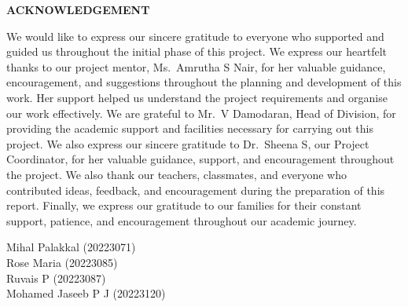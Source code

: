 \clearpage
{}
{}
\thispagestyle{footeronly}
\begin{center}
{\fontsize{16}{20}\selectfont \textbf{ACKNOWLEDGEMENT}}
\end{center}

\vspace{0.8cm}
\justifying
\noindent
We would like to express our sincere gratitude to everyone who supported and guided us throughout the initial phase of this project. We express our heartfelt thanks to our project mentor, Ms.~Amrutha S Nair, for her valuable guidance, encouragement, and suggestions throughout the planning and development of this work. Her support helped us understand the project requirements and organise our work effectively. We are grateful to Mr.~V Damodaran, Head of Division, for providing the academic support and facilities necessary for carrying out this project. We also express our sincere gratitude to Dr.~Sheena S, our Project Coordinator, for her valuable guidance, support, and encouragement throughout the project. We also thank our teachers, classmates, and everyone who contributed ideas, feedback, and encouragement during the preparation of this report. Finally, we express our gratitude to our families for their constant support, patience, and encouragement throughout our academic journey.

\vspace{2cm}

\begin{flushleft}
Mihal Palakkal (20223071)\\[0.2cm]
Rose Maria (20223085)\\[0.2cm]
Ruvais P (20223087)\\[0.2cm]
Mohamed Jaseeb P J (20223120)
\end{flushleft}

\clearpage
